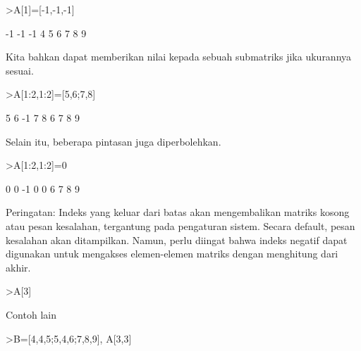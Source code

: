 \documentclass[a4paper,10pt]{article}
\begin{document}
\begin{eulernotebook}
\begin{eulercomment}
\begin{eulercomment}
\begin{eulercomment}
\begin{eulercomment}
\begin{eulercomment}
\begin{eulercomment}
\begin{eulercomment}
\begin{eulercomment}
\begin{eulercomment}
\end{eulercomment}
\begin{eulerprompt}
>A[1]=[-1,-1,-1]
\end{eulerprompt}
\begin{euleroutput}
             -1            -1            -1 
              4             5             6 
              7             8             9 
\end{euleroutput}
\begin{eulercomment}
Kita bahkan dapat memberikan nilai kepada sebuah submatriks jika
ukurannya sesuai.
\end{eulercomment}
\begin{eulerprompt}
>A[1:2,1:2]=[5,6;7,8]
\end{eulerprompt}
\begin{euleroutput}
              5             6            -1 
              7             8             6 
              7             8             9 
\end{euleroutput}
\begin{eulercomment}
Selain itu, beberapa pintasan juga diperbolehkan.
\end{eulercomment}
\begin{eulerprompt}
>A[1:2,1:2]=0
\end{eulerprompt}
\begin{euleroutput}
              0             0            -1 
              0             0             6 
              7             8             9 
\end{euleroutput}
\begin{eulercomment}
Peringatan: Indeks yang keluar dari batas akan mengembalikan matriks
kosong atau pesan kesalahan, tergantung pada pengaturan sistem. Secara
default, pesan kesalahan akan ditampilkan. Namun, perlu diingat bahwa
indeks negatif dapat digunakan untuk mengakses elemen-elemen matriks
dengan menghitung dari akhir.
\end{eulercomment}
\begin{eulerprompt}
>A[3]
\end{eulerprompt}
\begin{euleroutput}
  [7,  8,  9]
\end{euleroutput}
\begin{eulercomment}
Contoh lain
\end{eulercomment}
\begin{eulerprompt}
>B=[4,4,5;5,4,6;7,8,9], A[3,3]
\end{eulerprompt}
\begin{euleroutput}

\end{euleroutput}
\end{eulercomment}
\end{eulercomment}
\end{eulercomment}
\end{eulercomment}
\end{eulercomment}
\end{eulercomment}
\end{eulercomment}
\end{eulercomment}
\end{eulernotebook}
\end{document}
